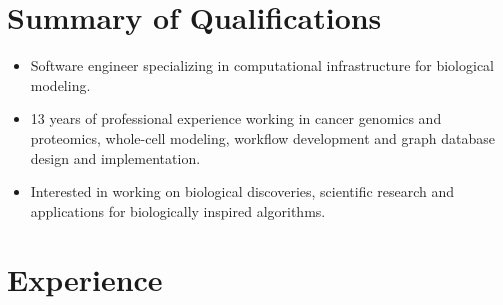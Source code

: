 \makecvtitle

\section{Summary of Qualifications}

\begin{itemize}
\item Software engineer specializing in computational infrastructure for biological modeling.
\item 13 years of professional experience working in cancer genomics and proteomics, whole-cell modeling, workflow development and graph database design and implementation.
\item Interested in working on biological discoveries, scientific research and applications for biologically inspired algorithms. 
\end{itemize}

\section{Experience}





